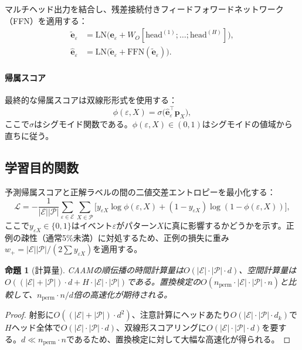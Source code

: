 \documentclass[sigconf,nonacm]{acmart}
\newtheorem{proposition}{命題}
\begin{document}
マルチヘッド出力を結合し、残差接続付きフィードフォワードネットワーク（FFN）を適用する：
\begin{align}
    \tilde{\mathbf{e}}_\varepsilon &= \text{LN}\!\bigl(\mathbf{e}_\varepsilon + W_O [\text{head}^{(1)}; \ldots; \text{head}^{(H)}]\bigr), \\
    \hat{\mathbf{e}}_\varepsilon &= \text{LN}\!\bigl(\tilde{\mathbf{e}}_\varepsilon + \text{FFN}(\tilde{\mathbf{e}}_\varepsilon)\bigr).
\end{align}

\paragraph{帰属スコア}
最終的な帰属スコアは双線形形式を使用する：
\begin{equation}
    \phi(\varepsilon, X) = \sigma\!\bigl(\hat{\mathbf{e}}_\varepsilon^\top \mathbf{p}_X\bigr),
\end{equation}
ここで$\sigma$はシグモイド関数である。$\phi(\varepsilon, X) \in (0, 1)$はシグモイドの値域から直ちに従う。

\subsection{学習目的関数}

予測帰属スコアと正解ラベルの間の二値交差エントロピーを最小化する：
\begin{equation}
    \mathcal{L} = -\frac{1}{|\mathcal{E}||\mathcal{P}|} \sum_{\varepsilon \in \mathcal{E}} \sum_{X \in \mathcal{P}} \bigl[y_{\varepsilon X} \log \phi(\varepsilon, X) + (1 - y_{\varepsilon X}) \log(1 - \phi(\varepsilon, X))\bigr],
\end{equation}
ここで$y_{\varepsilon X} \in \{0, 1\}$はイベント$\varepsilon$がパターン$X$に真に影響するかどうかを示す。正例の疎性（通常5\%未満）に対処するため、正例の損失に重み$w_+ = |\mathcal{E}||\mathcal{P}| / (2 \sum y_{\varepsilon X})$を適用する。

\begin{proposition}[計算量]
\label{prop:complexity}
CAAMの順伝播の時間計算量は$O(|\mathcal{E}| \cdot |\mathcal{P}| \cdot d)$、空間計算量は$O((|\mathcal{E}| + |\mathcal{P}|) \cdot d + H \cdot |\mathcal{E}| \cdot |\mathcal{P}|)$である。置換検定の$O(n_{\text{perm}} \cdot |\mathcal{E}| \cdot |\mathcal{P}| \cdot n)$と比較して、$n_{\text{perm}} \cdot n / d$倍の高速化が期待される。
\end{proposition}

\begin{proof}
射影に$O((|\mathcal{E}| + |\mathcal{P}|) \cdot d^2)$、注意計算にヘッドあたり$O(|\mathcal{E}| \cdot |\mathcal{P}| \cdot d_k)$で$H$ヘッド全体で$O(|\mathcal{E}| \cdot |\mathcal{P}| \cdot d)$、双線形スコアリングに$O(|\mathcal{E}| \cdot |\mathcal{P}| \cdot d)$を要する。$d \ll n_{\text{perm}} \cdot n$であるため、置換検定に対して大幅な高速化が得られる。
\end{proof}
\end{document}
